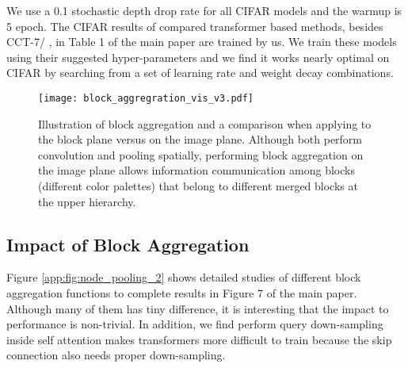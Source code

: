 \documentclass{article}
\begin{document}
We use a 0.1 stochastic depth drop rate for all CIFAR models and the warmup is 5 epoch. The CIFAR results of compared transformer based methods, besides CCT-7/ \cite{hassani2021escaping}, in Table 1 of the main paper are trained by us. We train these models using their suggested hyper-parameters and we find it works nearly optimal on CIFAR by searching from a set of learning rate and weight decay combinations. 


\begin{figure*}[t]
    \centering
    \texttt{[image: block\_aggregration\_vis\_v3.pdf]}
    \caption{Illustration of block aggregation and a comparison when applying to the block plane versus on the image plane. 
    Although both perform convolution and pooling spatially, performing block aggregation on the image plane allows information communication among blocks (different color palettes) that belong to different merged blocks at the upper hierarchy.}
    \label{app:fig:block_aggregration_vis}
    \vspace{-.2cm}
\end{figure*}

\subsection{Impact of Block Aggregation}
\label{app:block}
Figure \ref{app:fig:node_pooling_2} shows detailed studies of different block aggregation functions to complete results in Figure 7 of the main paper. Although many of them has tiny difference, it is interesting that the impact to performance is non-trivial.  
In addition, we find perform query down-sampling inside self attention makes transformers more difficult to train because the skip connection also needs proper down-sampling. 
\end{document}

